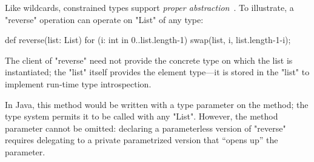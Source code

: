 {

Like wildcards,
constrained types support
\emph{proper abstraction}~\cite{adding-wildcards}.  To illustrate, a
\xcd"reverse"
operation can operate on \xcd"List" of any type:
{
\begin{xten}
def reverse(list: List) {
  for (i: int in 0..list.length-1)
    swap(list, i, list.length-1-i);
}
\end{xten}}

\noindent
The client of \xcd"reverse" need not provide the concrete type
on which the list is instantiated; the \xcd"list" itself
provides the element type---it is stored in the \xcd"list"
to implement run-time type introspection.

In Java, this method would be written with a type parameter on
the method; the type system permits it to be called with any
\xcd"List".
However,
the method parameter cannot be omitted: declaring a parameterless version
of \xcd"reverse" requires delegating to a private parametrized version that
``opens up'' the parameter.

%

}


